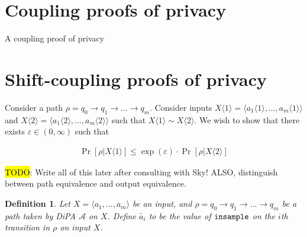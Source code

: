 \documentclass{article}
\newtheorem{definition}{Definition}[section]
\renewcommand{\epsilon}{\varepsilon}
\newcommand{\insample}{\textup{\texttt{insample}}}
\newcommand{\1}{\langle 1 \rangle}
\newcommand{\2}{\langle 2 \rangle}
\begin{document}
\section{Coupling proofs of privacy}

A coupling proof of privacy 

\section{Shift-coupling proofs of privacy}

Consider a path $\rho = q_0 \to q_1 \to \dots \to q_m$. Consider inputs $X \langle 1 \rangle = \langle a_1 \langle 1 \rangle, \dots, a_m \langle 1 \rangle \rangle$ and $X \langle 2 \rangle = \langle a_1 \langle 2 \rangle, \dots, a_m \langle 2 \rangle \rangle$ such that $X \langle 1 \rangle \sim X \langle 2 \rangle$. We wish to show that there exists $\epsilon \in (0, \infty)$ such that

\begin{align*}
    \Pr\left[\rho | X \langle 1 \rangle \right] \leq \exp(\epsilon) \cdot \Pr\left[\rho | X \langle 2 \rangle\right]
\end{align*}

\hl{TODO}: Write all of this later after consulting with Sky! ALSO, distinguish between path equivalence and output equivalence.

\begin{definition}
    Let  $X = \langle a_1, \dots, a_m \rangle$ be an input, and $\rho = q_0 \to q_1 \to \dots \to q_m$ be a path taken by DiPA $\mathcal{A}$ on $X$. Define $\tilde{a_i}$ to be the value of $\insample$ on the $i$th transition in $\rho$ on input $X$.
\end{definition}
\end{document}
